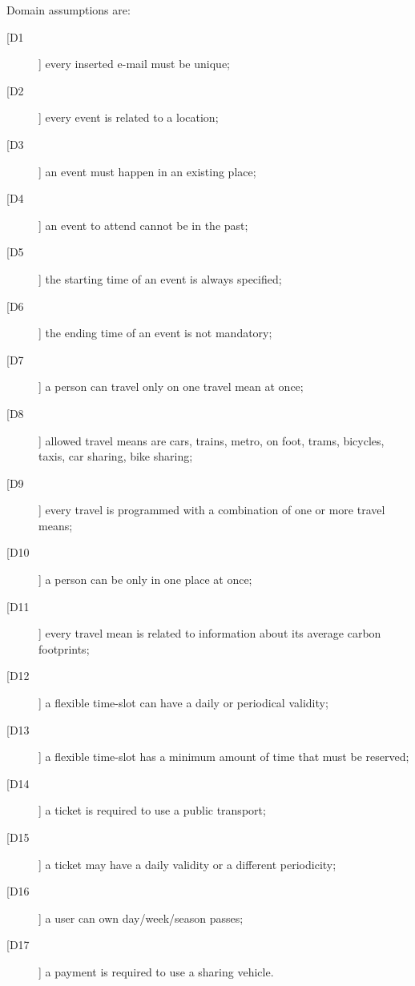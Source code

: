 Domain assumptions are:
\begin{description}
\item[[D1]] every inserted e-mail must be unique;
\item[[D2]] every event is related to a location;
\item[[D3]] an event must happen in an existing place;
\item[[D4]] an event to attend cannot be in the past;
\item[[D5]] the starting time of an event is always specified;
\item[[D6]] the ending time of an event is not mandatory;
\item[[D7]] a person can travel only on one travel mean at once; 
\item[[D8]] allowed travel means are cars, trains, metro, on foot, trams, bicycles, taxis, car sharing, bike sharing;
\item[[D9]] every travel is programmed with a combination of one or more travel means;
\item[[D10]] a person can be only in one place at once;
\item[[D11]] every travel mean is related to information about its average carbon footprints; 
\item[[D12]] a flexible time-slot can have a daily or periodical validity;
\item[[D13]] a flexible time-slot has a minimum amount of time that must be reserved;
\item[[D14]] a ticket is required to use a public transport;
\item[[D15]] a ticket may have a daily validity or a different periodicity;
\item[[D16]] a user can own day/week/season passes;
\item[[D17]] a payment is required to use a sharing vehicle.
\end{description}
